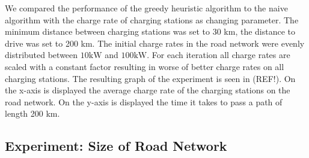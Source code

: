 We compared the performance of the greedy heuristic algorithm to the naive algorithm with the charge rate of charging stations as changing parameter. The minimum distance between charging stations was set to 30 km, the distance to drive was set to 200 km. The initial charge rates in the road network were evenly distributed between $10 \si{\kW}$ and $100 \si{\kW}$. For each iteration all charge rates are scaled with a constant factor resulting in worse of better charge rates on all charging stations. The resulting graph of the experiment is seen in (REF!). On the x-axis is displayed the average charge rate of the charging stations on the road network. On the y-axis is displayed the time it takes to pass a path of length 200 km. 

\subsection{Experiment: Size of Road Network}

